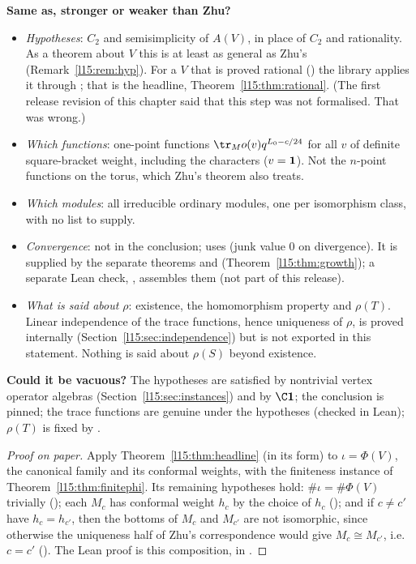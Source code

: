 \begin{dictionary}
\textbf{Same as, stronger or weaker than Zhu?}
\begin{itemize}
\item \emph{Hypotheses}: $C_2$ and semisimplicity of $A(V)$, in place of $C_2$ and rationality. As a theorem about $V$ this is
  at least as general as Zhu's (Remark~\ref{l15:rem:hyp}). For a $V$ that is proved rational ()
  the library applies it through \allowbreak{}\allowbreak{}; that is the headline,
  Theorem~\ref{l15:thm:rational}. (The first release revision of this chapter said that this step was not formalised. That
  was wrong.)
\item \emph{Which functions}: one-point functions $\tr_Mo(v)q^{L_0-c/24}$ for all $v$ of definite square-bracket weight,
  including the characters ($v=\mathbf{1}$). Not the $n$-point functions on the torus, which Zhu's theorem also treats.
\item \emph{Which modules}: all irreducible ordinary modules, one per isomorphism class, with no list to supply.
\item \emph{Convergence}: not in the conclusion;  uses  (junk value $0$ on divergence). It is
  supplied by the separate theorems  and 
  (Theorem~\ref{l15:thm:growth}); a separate Lean check, \allowbreak{}, assembles them
  (not part of this release).
\item \emph{What is said about $\rho$}: existence, the homomorphism property and $\rho(T)$. Linear independence of the trace
  functions, hence uniqueness of $\rho$, is proved internally (Section~\ref{l15:sec:independence}) but is not exported in
  this statement. Nothing is said about $\rho(S)$ beyond existence.
\end{itemize}

\textbf{Could it be vacuous?} The hypotheses are satisfied by nontrivial vertex operator algebras
(Section~\ref{l15:sec:instances}) and by $\C\lfifteenvac$; the conclusion is pinned; the trace functions are genuine under
the hypotheses (checked in Lean); $\rho(T)$ is fixed by .
\end{dictionary}

\begin{proof}[Proof on paper]
Apply Theorem~\ref{l15:thm:headline} (in its  form) to $\iota=\Phi(V)$, the canonical family and its
conformal weights, with the finiteness instance of Theorem~\ref{l15:thm:finitephi}. Its remaining hypotheses hold: $\#\iota
=\#\Phi(V)$ trivially (); each $M_c$ has conformal weight $h_c$ by the choice of $h_c$
(); and if $c\neq c'$ have $h_c=h_{c'}$, then the bottoms of $M_c$ and $M_{c'}$
are not isomorphic, since otherwise the uniqueness half of Zhu's correspondence would give $M_c\cong M_{c'}$, i.e.\ $c=c'$
(). The Lean proof is this composition, in .
\end{proof}

